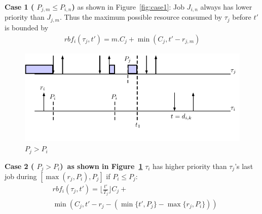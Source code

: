 \documentclass[12pt,conference,twocolumn]{IEEEtran}
\begin{document}
\textbf{Case 1 ( $P_{j,m}\leq P_{i,n}$)} as shown in  Figure~\ref{fig:case1}: Job $J_{i,n}$ always has lower priority than  $J_{j,m}$. Thus   the maximum possible resource consumed by $\tau_{j}$  before $t'$ is  bounded by
	\begin{align*}
		rbf_i(\tau_j,t')=m.C_j +\min(C_j,t'-r_{j,m})
	\end{align*}
 






\begin{figure}[h!]
 \centering
\includegraphics[scale=0.7]{Figure/C2}  
\caption{$P_j> P_i$}
  \label{fig:case2}
\end{figure}

\textbf{Case 2 ( $P_j> P_i$)~as shown in  Figure~\ref{fig:case2}} $\tau_i$ has higher priority than $\tau_j$'s last job during $[\max(r_j,P_i),P_j]$ if $P_i\leq P_j$:
	\begin{align*}
		&rbf_i(\tau_j,t')=\lfloor \frac{t'}{T_j} \rfloor C_j +
\\&\min\left(C_j,\!t'\!-\!r_j\!-\!\left(\min\{t'\!,\!P_j\}\!-\!\max\{r_j\!,\!P_i\}\right)\right)
		\end{align*}
\end{document}
